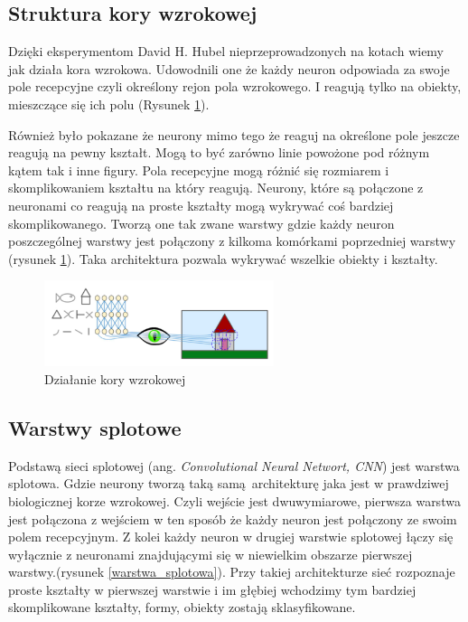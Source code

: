 \documentclass{article}
\begin{document}
\subsection{Struktura kory wzrokowej}
Dzięki eksperymentom David H. Hubel nieprzeprowadzonych na kotach wiemy jak działa kora wzrokowa.\cite{David_1958} \cite{David_1959}
Udowodnili one że każdy neuron odpowiada za swoje pole recepcyjne czyli określony rejon pola wzrokowego. I reagują tylko na obiekty, mieszczące się ich polu (Rysunek \ref{kora_wzrokowa}). \cite{geron}

Również było pokazane że neurony mimo tego że reaguj na określone pole jeszcze reagują na pewny kształt. Mogą to być zarówno linie powożone pod różnym kątem tak i inne figury. Pola recepcyjne mogą różnić się rozmiarem i skomplikowaniem kształtu na który reagują. Neurony, które są połączone z neuronami co reagują na proste kształty mogą wykrywać coś bardziej skomplikowanego. Tworzą one tak zwane warstwy gdzie każdy neuron poszczególnej warstwy jest połączony z kilkoma komórkami poprzedniej warstwy (rysunek \ref{kora_wzrokowa}). Taka architektura pozwala wykrywać wszelkie obiekty i kształty. \cite{geron}

\begin{figure}[H]
	\centering
	\includegraphics[width=0.6\textwidth,keepaspectratio=true]{kora_wzrokowa}
	\caption{Działanie kory wzrokowej \cite{geron}}
	\label{kora_wzrokowa}
\end{figure}

\subsection{Warstwy splotowe}
Podstawą sieci splotowej (ang. \textit{Convolutional Neural Networt, CNN}) jest warstwa splotowa. Gdzie neurony tworzą taką samą architekturę jaka jest w prawdziwej biologicznej korze wzrokowej. Czyli wejście jest dwuwymiarowe, pierwsza warstwa jest połączona z wejściem w ten sposób że każdy neuron jest połączony ze swoim polem recepcyjnym. Z kolei każdy neuron w drugiej warstwie splotowej łączy się wyłącznie z neuronami znajdującymi się w niewielkim obszarze pierwszej warstwy.(rysunek \ref{warstwa_splotowa}).
Przy takiej architekturze sieć rozpoznaje proste kształty w pierwszej warstwie i im głębiej wchodzimy tym bardziej skomplikowane kształty, formy, obiekty zostają sklasyfikowane. \cite{geron}
\end{document}
